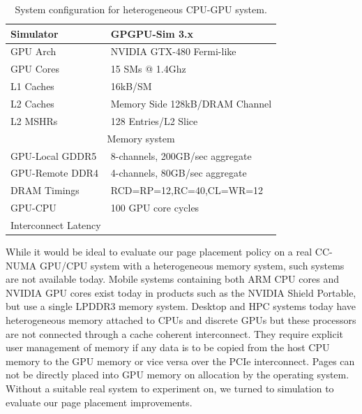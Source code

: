\begin{table}[t]
\begin{center}
\begin{small}
\begin{tabular}{|l|l|}
\hline
Simulator & GPGPU-Sim 3.x\\
\hline
GPU Arch & NVIDIA GTX-480 Fermi-like\\
\hline
GPU Cores& 15 {\color{black}SMs} @ 1.4Ghz\\
\hline
L1 Caches & 16kB/SM \\
\hline
L2 Caches & Memory Side 128kB/DRAM Channel\\
\hline
L2 MSHRs & 128 Entries/L2 Slice\\
\hline
\hline
\multicolumn{2}{|c|}{Memory system}\\
\hline
GPU-Local GDDR5 & 8-channels, 200GB/sec aggregate\\
\hline
GPU-Remote DDR4& 4-channels, 80GB/sec aggregate\\
\hline
DRAM Timings & \multicolumn{1}{|l|}{RCD=RP=12,RC=40,CL=WR=12}\\
\hline
GPU-CPU &  100 GPU core cycles\\
Interconnect Latency & \\
\hline
\end{tabular}
\caption{System configuration for heterogeneous CPU-GPU system.}
\label{tab:asplos2015:bw-methodology}
\end{small}
\end{center}
\vspace{-0.15in}
\end{table}


While it would be ideal to evaluate our page placement policy on a real CC-NUMA
GPU/CPU system with a heterogeneous memory system, such systems are not available today.
Mobile systems containing both ARM CPU cores and NVIDIA GPU cores exist today in products
such as the NVIDIA Shield Portable, but use a single LPDDR3 memory system.
Desktop and HPC systems today have heterogeneous memory attached to CPUs and discrete
GPUs but these processors are not connected through a cache coherent interconnect.  They require explicit user 
management of memory if any data is to be copied from the host CPU memory to the GPU memory or vice versa
over the PCIe interconnect. Pages can not be directly placed into GPU memory on allocation by the operating system.
Without a suitable real system to experiment on, we turned to simulation to evaluate our
page placement improvements.

